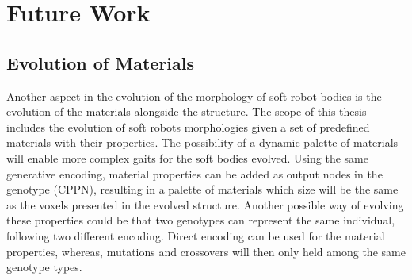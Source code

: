 
\chapter{Future Work} %

\label{Future Work} %


\section{Evolution of Materials}
Another aspect in the evolution of the morphology of soft robot bodies is the evolution of the materials alongside the structure. The scope of this thesis includes the evolution of soft robots morphologies given a set of predefined materials with their properties. The possibility of a dynamic palette of materials will enable more complex gaits for the soft bodies evolved. Using the same generative encoding, material properties can be added as output nodes in the genotype (CPPN), resulting in a palette of materials which size will be the same as the voxels presented in the evolved structure. Another possible way of evolving these properties could be that two genotypes can represent the same individual, following two different encoding. Direct encoding can be used for the material properties, whereas, mutations and crossovers will then only held among the same genotype types.